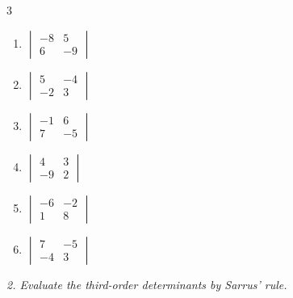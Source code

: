 \begin{multicols}{3}
\begin{enumerate}[label=\arabic*.,  leftmargin=*]
\item $\begin{vmatrix} -8 & 5 \\ 6 & -9 \end{vmatrix}$
\item $\begin{vmatrix} 5 & -4 \\ -2 & 3 \end{vmatrix}$
\item $\begin{vmatrix} -1 & 6 \\ 7 & -5 \end{vmatrix}$
\item $\begin{vmatrix} 4 & 3 \\ -9 & 2 \end{vmatrix}$
\item $\begin{vmatrix} -6 & -2 \\ 1 & 8 \end{vmatrix}$
\item $\begin{vmatrix} 7 & -5 \\ -4 & 3 \end{vmatrix}$
\end{enumerate}
\end{multicols}
\emph{2. Evaluate the third-order determinants by Sarrus’ rule.}
\bigskip
